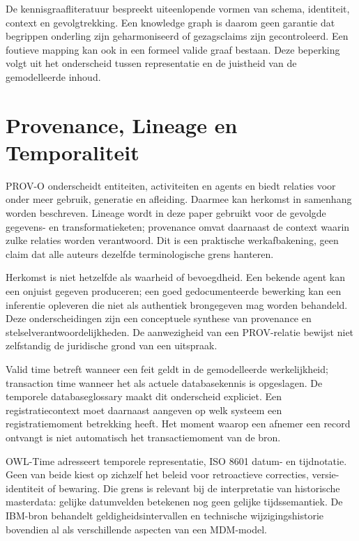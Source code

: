De kennisgraafliteratuur bespreekt uiteenlopende vormen van schema, identiteit, context en gevolgtrekking. Een knowledge graph is daarom geen garantie dat begrippen onderling zijn geharmoniseerd of gezagsclaims zijn gecontroleerd. Een foutieve mapping kan ook in een formeel valide graaf bestaan. Deze beperking volgt uit het onderscheid tussen representatie en de juistheid van de gemodelleerde inhoud. \parencite{L13,S32}

\section{Provenance, Lineage en Temporaliteit}
PROV-O onderscheidt entiteiten, activiteiten en agents en biedt relaties voor onder meer gebruik, generatie en afleiding. Daarmee kan herkomst in samenhang worden beschreven. Lineage wordt in deze paper gebruikt voor de gevolgde gegevens- en transformatieketen; provenance omvat daarnaast de context waarin zulke relaties worden verantwoord. Dit is een praktische werkafbakening, geen claim dat alle auteurs dezelfde terminologische grens hanteren. \parencite{S33}

Herkomst is niet hetzelfde als waarheid of bevoegdheid. Een bekende agent kan een onjuist gegeven produceren; een goed gedocumenteerde bewerking kan een inferentie opleveren die niet als authentiek brongegeven mag worden behandeld. Deze onderscheidingen zijn een conceptuele synthese van provenance en stelselverantwoordelijkheden. De aanwezigheid van een PROV-relatie bewijst niet zelfstandig de juridische grond van een uitspraak. \parencite{S33,S25}

Valid time betreft wanneer een feit geldt in de gemodelleerde werkelijkheid; transaction time wanneer het als actuele databasekennis is opgeslagen. De temporele databaseglossary maakt dit onderscheid expliciet. Een registratiecontext moet daarnaast aangeven op welk systeem een registratiemoment betrekking heeft. Het moment waarop een afnemer een record ontvangt is niet automatisch het transactiemoment van de bron. \parencite{L14}

OWL-Time adresseert temporele representatie, ISO 8601 datum- en tijdnotatie. Geen van beide kiest op zichzelf het beleid voor retroactieve correcties, versie-identiteit of bewaring. Die grens is relevant bij de interpretatie van historische masterdata: gelijke datumvelden betekenen nog geen gelijke tijdssemantiek. De IBM-bron behandelt geldigheidsintervallen en technische wijzigingshistorie bovendien al als verschillende aspecten van een MDM-model. \parencite{S37,S52,P01}

